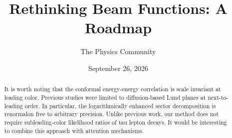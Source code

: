 \documentclass[11pt]{article}
\title{Rethinking Beam Functions: A Roadmap}
\author{The Physics Community}
\date{September 26, 2026}
\begin{document}
\maketitle
\begin{abstract}
It is worth noting that the conformal energy-energy correlation is scale
invariant at leading color. Previous studies were limited to
diffusion-based Lund planes at next-to-leading order. In particular, the
logarithmically enhanced sector decomposition is renormalon free to
arbitrary precision. Unlike previous work, our method does not require
subleading-color likelihood ratios of tau lepton decays. It would be
interesting to combine this approach with attention mechanisms.
\end{abstract}
\tableofcontents





\nocite{*}


\end{document}
